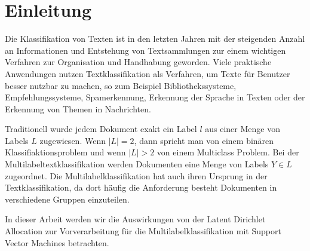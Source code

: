 \section{Einleitung}

\begin{comment}
Einführung und Einbettung des Problems
Was ist die konkrete Problemstellung / Fragestellung der Arbeit
Literature Review
\end{comment}

Die Klassifikation von Texten ist in den letzten Jahren mit der steigenden Anzahl an Informationen und Entstehung von Textsammlungen zur einem wichtigen Verfahren zur Organisation und Handhabung geworden.
Viele praktische Anwendungen nutzen Textklassifikation als Verfahren, um Texte für Benutzer besser nutzbar zu machen, so zum Beispiel Bibliothekssysteme, Empfehlungssysteme, Spamerkennung, Erkennung der Sprache in Texten oder der Erkennung von Themen in Nachrichten.

Traditionell wurde jedem Dokument exakt ein Label $l$ aus einer Menge von Labels $L$ zugewiesen.
Wenn $|L| = 2$, dann spricht man von einem binären Klassifiaktionsproblem und wenn $|L| > 2$ von einem Multiclass Problem.
Bei der Multilabeltextklassifikation werden Dokumenten eine Menge von Labels $Y \in L$ zugeordnet.
Die Multilabelklassifikation hat auch ihren Ursprung in der Textklassifikation, da dort häufig die Anforderung besteht Dokumenten in verschiedene Gruppen einzuteilen.

In dieser Arbeit werden wir die Auswirkungen von der Latent Dirichlet Allocation zur Vorverarbeitung für die Multilabelklassifikation mit Support Vector Machines betrachten.


